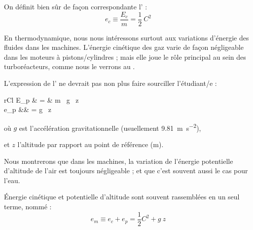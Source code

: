 	On définit bien sûr de façon correspondante l’ :
	\begin{equation}
		e_{c} \equiv \frac{E_{c}}{m} = \frac{1}{2} \ C^2
		\label{def_énergie_cinétique_spécifique}
	\end{equation}


	En thermodynamique, nous nous intéressons surtout aux variations d’énergie des fluides dans les machines. L’énergie cinétique des gaz varie de façon négligeable dans les moteurs à pistons/cylindres ; mais elle joue le rôle principal au sein des turboréacteurs, comme nous le verrons au \coursdix.

	L’expression de l’ ne devrait pas non plus faire sourciller l’étudiant/e :
	\begin{IEEEeqnarray}{rCl}
		E_p 	& = & m \ g \ z	\\
		e_p 	&\equiv&   = g \ z
		\label{eq_énergie_potentielle}
	\end{IEEEeqnarray}

	\begin{equationterms}		 
		\item où \tab $g$ \tab est l’accélération gravitationnelle (usuellement \SI{9,81}{\metre\per\second\squared}),
		\item et \tab $z$ \tab l’altitude par rapport au point de référence (\si{\metre}).
	\end{equationterms}

	Nous montrerons que dans les machines, la variation de l’énergie potentielle d’altitude de l’air est toujours négligeable ; et que c’est souvent aussi le cas pour l’eau.

	Énergie cinétique et potentielle d’altitude sont souvent rassemblées en un seul terme, nommé  :
	\begin{equation}
		e_{m} \equiv e_{c} + e_p = \frac{1}{2}C^2 + g \ z
		\label{def_énergie_mécanique_spécifique}
	\end{equation}


